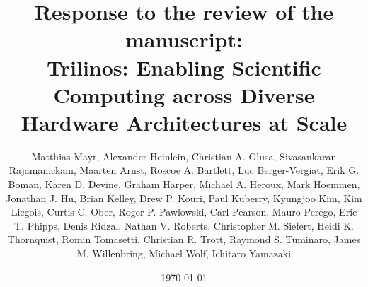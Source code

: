 \documentclass[manuscript,nonacm]{acmart}
\let\oldmaketitle\maketitle
\renewcommand{\maketitle}{%
    \oldmaketitle
    \pagestyle{empty}%
    \fancyhead{}%
    \fancyfoot{}%
  }%
\begin{document}
\title{{\small Response to the review of the manuscript:}\\Trilinos: Enabling Scientific Computing across Diverse Hardware Architectures at Scale}
\author{Matthias Mayr, Alexander Heinlein, Christian A. Glusa, Sivasankaran Rajamanickam, Maarten Arnst, Roscoe A. Bartlett, Luc Berger-Vergiat, Erik G. Boman, Karen D. Devine, Graham Harper, Michael A. Heroux, Mark Hoemmen, Jonathan J. Hu, Brian Kelley, Drew P. Kouri, Paul Kuberry, Kyungjoo Kim, Kim Liegois, Curtis C. Ober, Roger P. Pawlowski, Carl Pearson, Mauro Perego, Eric T. Phipps, Denis Ridzal, Nathan V. Roberts, Christopher M. Siefert, Heidi K. Thornquist, Romin Tomasetti, Christian R. Trott, Raymond S. Tuminaro, James M. Willenbring, Michael Wolf, Ichitaro Yamazaki}
\date{\today}

\maketitle


\pagebreak
{}

\end{document}
